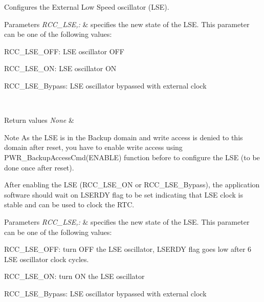 Configures the External Low Speed oscillator (L\-S\-E). 


\begin{DoxyParams}{Parameters}
{\em R\-C\-C\-\_\-\-L\-S\-E,\-:} & specifies the new state of the L\-S\-E. This parameter can be one of the following values\-: \begin{DoxyItemize}
\item R\-C\-C\-\_\-\-L\-S\-E\-\_\-\-O\-F\-F\-: L\-S\-E oscillator O\-F\-F \item R\-C\-C\-\_\-\-L\-S\-E\-\_\-\-O\-N\-: L\-S\-E oscillator O\-N \item R\-C\-C\-\_\-\-L\-S\-E\-\_\-\-Bypass\-: L\-S\-E oscillator bypassed with external clock \end{DoxyItemize}
\\
\hline
\end{DoxyParams}

\begin{DoxyRetVals}{Return values}
{\em None} & \\
\hline
\end{DoxyRetVals}
\begin{DoxyNote}{Note}
As the L\-S\-E is in the Backup domain and write access is denied to this domain after reset, you have to enable write access using P\-W\-R\-\_\-\-Backup\-Access\-Cmd(\-E\-N\-A\-B\-L\-E) function before to configure the L\-S\-E (to be done once after reset). 

After enabling the L\-S\-E (R\-C\-C\-\_\-\-L\-S\-E\-\_\-\-O\-N or R\-C\-C\-\_\-\-L\-S\-E\-\_\-\-Bypass), the application software should wait on L\-S\-E\-R\-D\-Y flag to be set indicating that L\-S\-E clock is stable and can be used to clock the R\-T\-C. 
\end{DoxyNote}

\begin{DoxyParams}{Parameters}
{\em R\-C\-C\-\_\-\-L\-S\-E,\-:} & specifies the new state of the L\-S\-E. This parameter can be one of the following values\-: \begin{DoxyItemize}
\item R\-C\-C\-\_\-\-L\-S\-E\-\_\-\-O\-F\-F\-: turn O\-F\-F the L\-S\-E oscillator, L\-S\-E\-R\-D\-Y flag goes low after 6 L\-S\-E oscillator clock cycles. \item R\-C\-C\-\_\-\-L\-S\-E\-\_\-\-O\-N\-: turn O\-N the L\-S\-E oscillator \item R\-C\-C\-\_\-\-L\-S\-E\-\_\-\-Bypass\-: L\-S\-E oscillator bypassed with external clock \end{DoxyItemize}
\\
\hline
\end{DoxyParams}


